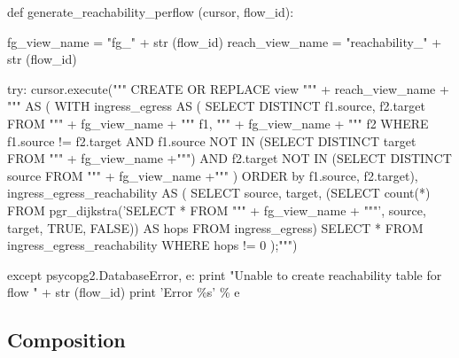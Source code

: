 \begin{sql}
def generate_reachability_perflow (cursor, flow_id):

    fg_view_name = "fg_" + str (flow_id)
    reach_view_name = "reachability_" + str (flow_id)

    try:
        cursor.execute("""
        CREATE OR REPLACE view """ + reach_view_name + """ AS (
          WITH ingress_egress AS (
               SELECT DISTINCT f1.source, f2.target
               FROM """ + fg_view_name + """ f1, """ + fg_view_name + """ f2
               WHERE f1.source != f2.target AND
                     f1.source NOT IN (SELECT DISTINCT target FROM """ + fg_view_name +""") AND
                     f2.target NOT IN (SELECT DISTINCT source FROM """ + fg_view_name +""" )
               ORDER by f1.source, f2.target),
               ingress_egress_reachability AS (
               SELECT source, target,
                      (SELECT count(*)
                       FROM pgr_dijkstra('SELECT * FROM """ + fg_view_name + """',
                                         source, target, TRUE, FALSE)) AS hops
               FROM ingress_egress)
          SELECT * FROM ingress_egress_reachability WHERE hops != 0
        );""")

    except psycopg2.DatabaseError, e:
        print "Unable to create reachability table for flow " + str (flow_id)
        print 'Error \%s' \% e      
\end{sql}





\subsection{Composition}
\label{subsec:compose}


